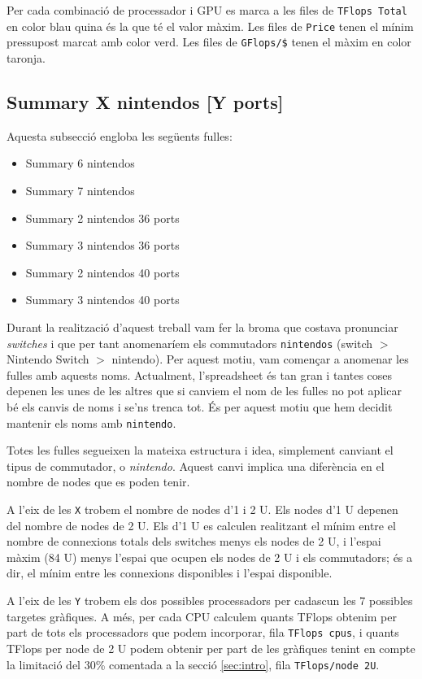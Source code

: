 Per cada combinació de processador i GPU es marca a les files de \texttt{TFlops Total} en color blau quina és la que té el valor màxim. Les files de \texttt{Price} tenen el mínim pressupost marcat amb color verd. Les files de \texttt{GFlops/\$} tenen el màxim en color taronja.

\subsection{Summary X nintendos [Y ports]} \label{sec:annex_summary}
Aquesta subsecció engloba les següents fulles:
\begin{itemize}
    \item Summary 6 nintendos
    \item Summary 7 nintendos
    \item Summary 2 nintendos 36 ports
    \item Summary 3 nintendos 36 ports
    \item Summary 2 nintendos 40 ports
    \item Summary 3 nintendos 40 ports
\end{itemize}

Durant la realització d'aquest treball vam fer la broma que costava pronunciar \textit{switches} i que per tant anomenaríem els commutadors \texttt{nintendos} (switch $>$ Nintendo Switch $>$ nintendo). Per aquest motiu, vam començar a anomenar les fulles amb aquests noms.
Actualment, l'spreadsheet és tan gran i tantes coses depenen les unes de les altres que si canviem el nom de les fulles no pot aplicar bé els canvis de noms i se'ns trenca tot. És per aquest motiu que hem decidit mantenir els noms amb \texttt{nintendo}.

Totes les fulles segueixen la mateixa estructura i idea, simplement canviant el tipus de commutador, o \textit{nintendo}. Aquest canvi implica una diferència en el nombre de nodes que es poden tenir.

A l'eix de les \texttt{X} trobem el nombre de nodes d'1 i 2 U. Els nodes d'1 U depenen del nombre de nodes de 2 U. Els d'1 U es calculen realitzant el mínim entre el nombre de connexions totals dels switches menys els nodes de 2 U, i l'espai màxim (84 U) menys l'espai que ocupen els nodes de 2 U i els commutadors; és a dir, el mínim entre les connexions disponibles i l'espai disponible. 

A l'eix de les \texttt{Y} trobem els dos possibles processadors per cadascun les 7 possibles targetes gràfiques. A més, per cada CPU calculem quants TFlops obtenim per part de tots els processadors que podem incorporar, fila \texttt{TFlops cpus}, i quants TFlops per node de 2 U podem obtenir per part de les gràfiques tenint en compte la limitació del 30\% comentada a la secció \ref{sec:intro}, fila \texttt{TFlops/node 2U}.

